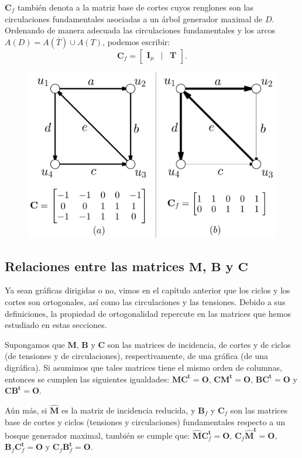 $\mathbf{C}_{f}$ también denota a la matriz base de cortes cuyos renglones son las circulaciones fundamentales asociadas a un árbol generador maximal de $D$. Ordenando de manera adecuada las circulaciones fundamentales y los arcos $A(D) = A(\overline{T}) \cup A(T)$, podemos escribir:
$$
\mathbf{C}_{f} = \begin{bmatrix}
\mathbf{I}_{\mu} & | & \mathbf{T}
\end{bmatrix}.
$$
\begin{figure}[h]
    \centering
    \includegraphics[scale=0.25]{img/imgchapter4/matrizdeciclosdirigidos.jpg}
    \caption{}
    \label{fig:matrizdeciclosdirigidos}
\end{figure}

\subsection{Relaciones entre las matrices $\mathbf{M}$, $\mathbf{B}$ y $\mathbf{C}$}

Ya sean gráficas dirigidas o no, vimos en el capítulo anterior que los ciclos y los cortes son ortogonales, así como las circulaciones y las tensiones. Debido a sus definiciones, la propiedad de ortogonalidad repercute en las matrices que hemos estudiado en estas secciones.

\begin{teo}
Supongamos que $\mathbf{M}$, $\mathbf{B}$ y $\mathbf{C}$ son las matrices de incidencia, de cortes y de ciclos (de tensiones y de circulaciones), respectivamente, de una gráfica (de una digráfica). Si asumimos que tales matrices tiene el mismo orden de columnas, entonces se cumplen las siguientes igualdades: $\mathbf{M}\mathbf{C^{t}} = \mathbf{O}$, $\mathbf{C}\mathbf{M^{t}} = \mathbf{O}$, $\mathbf{B}\mathbf{C^{t}} = \mathbf{O}$ y $\mathbf{C}\mathbf{B^{t}} = \mathbf{O}$.

Aún más, si $\mathbf{\widehat{M}}$ es la matriz de incidencia reducida, y $\mathbf{B}_{f}$ y $ \mathbf{C}_{f}$ son las matrices base de cortes y ciclos (tensiones y circulaciones) fundamentales respecto a un bosque generador maximal, también se cumple que: $\mathbf{\widehat{M}}\mathbf{C}_{f}^{\mathbf{t}} = \mathbf{O}$, $\mathbf{C}_{f}\mathbf{\widehat{M}^{t}} = \mathbf{O}$, $\mathbf{B}_{f}\mathbf{C}_{f}^{\mathbf{t}} = \mathbf{O}$ y $\mathbf{C}_{f}\mathbf{B}_{f}^{\mathbf{t}}= \mathbf{O}$.
\end{teo}

